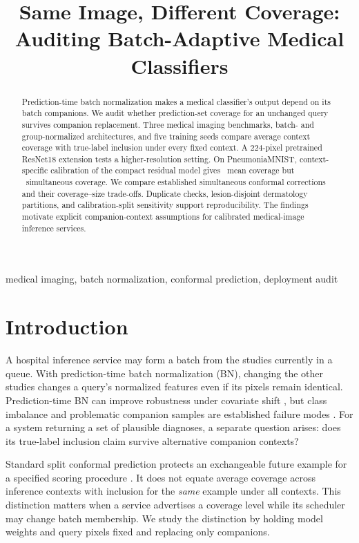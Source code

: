 \documentclass{article}
\title{Same Image, Different Coverage:\\Auditing Batch-Adaptive Medical Classifiers}
\begin{document}
\ninept
\maketitle
\begin{abstract}
Prediction-time batch normalization makes a medical classifier's output depend on its batch companions. We audit whether prediction-set coverage for an unchanged query survives companion replacement. Three medical imaging benchmarks, batch- and group-normalized architectures, and five training seeds compare average context coverage with true-label inclusion under every fixed context. A 224-pixel pretrained ResNet18 extension tests a higher-resolution setting. On PneumoniaMNIST, context-specific calibration of the compact residual model gives \PneuContextMean\ mean coverage but \PneuContextJoint\ simultaneous coverage. We compare established simultaneous conformal corrections and their coverage--size trade-offs. Duplicate checks, lesion-disjoint dermatology partitions, and calibration-split sensitivity support reproducibility. The findings motivate explicit companion-context assumptions for calibrated medical-image inference services.
\end{abstract}
\begin{keywords}
medical imaging, batch normalization, conformal prediction, deployment audit
\end{keywords}

\section{Introduction}
A hospital inference service may form a batch from the studies currently in a queue. With prediction-time batch normalization (BN), changing the other studies changes a query's normalized features even if its pixels remain identical. Prediction-time BN can improve robustness under covariate shift \cite{nado}, but class imbalance and problematic companion samples are established failure modes \cite{delta,medbn}. For a system returning a set of plausible diagnoses, a separate question arises: does its true-label inclusion claim survive alternative companion contexts?

Standard split conformal prediction protects an exchangeable future example for a specified scoring procedure \cite{angelopoulos}. It does not equate average coverage across inference contexts with inclusion for the \emph{same} example under all contexts. This distinction matters when a service advertises a coverage level while its scheduler may change batch membership. We study the distinction by holding model weights and query pixels fixed and replacing only companions.
\end{document}
